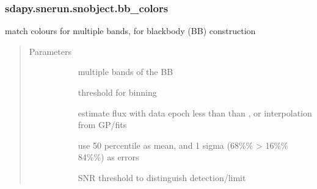\documentclass[letterpaper,10pt,english]{sphinxmanual}
\begin{document}
\begin{fulllineitems}
\begin{fulllineitems}
\begin{quote}
\begin{description}
\end{description}\end{quote}

\end{fulllineitems}



\subsubsection{sdapy.snerun.snobject.bb\_colors}
\label{\detokenize{generated/sdapy.snerun.snobject.bb_colors:sdapy-snerun-snobject-bb-colors}}\label{\detokenize{generated/sdapy.snerun.snobject.bb_colors::doc}}

\begin{fulllineitems}
\label{\detokenize{generated/sdapy.snerun.snobject.bb_colors:sdapy.snerun.snobject.bb_colors}}
match colours for multiple bands, for blackbody (BB) construction
\begin{quote}\begin{description}
\item[{Parameters}] \leavevmode\begin{description}
\item[{}] \leavevmode{[}\sphinxtitleref{list}{]}
multiple bands of the BB

\item[{}] \leavevmode{[}\sphinxtitleref{float}{]}
threshold for binning

\item[{}] \leavevmode{[}\sphinxtitleref{str}{]}
estimate flux with data epoch less than than , or interpolation from GP/fits

\item[{}] \leavevmode{[}\sphinxtitleref{list}{]}
use 50 percentile as mean, and 1 sigma (68\%\% \sphinxhyphen{}\textgreater{} 16\%\% \sphinxhyphen{} 84\%\%) as errors

\item[{}] \leavevmode{[}\sphinxtitleref{float}{]}
SNR threshold to distinguish detection/limit

\end{description}


\end{description}
\end{quote}
\end{fulllineitems}
\end{fulllineitems}
\end{document}
